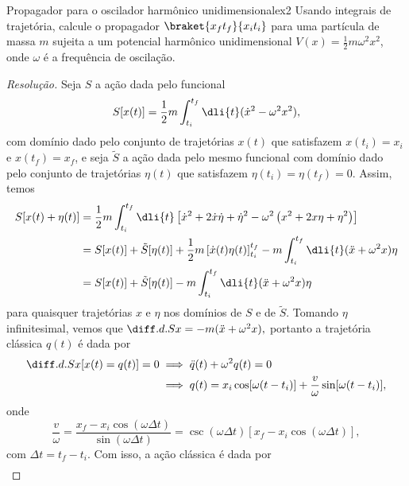\begin{exercício}{Propagador para o oscilador harmônico unidimensional}{ex2}
   Usando integrais de trajetória, calcule o propagador \(\braket{x_f t_f}{x_i t_i}\) para uma partícula de massa \(m\) sujeita a um potencial harmônico unidimensional \(V(x) = \frac12 m \omega^2 x^2\), onde \(\omega\) é a frequência de oscilação.
\end{exercício}
\begin{proof}[Resolução]
   Seja \(S\) a ação dada pelo funcional
   \begin{equation*}
      S[x(t)] = \frac12 m \int_{t_i}^{t_f} \dli{t} (\dot{x}^2 - \omega^2 x^2),
   \end{equation*}
   com domínio dado pelo conjunto de trajetórias \(x(t)\) que satisfazem \(x(t_i) = x_i\) e \(x(t_f) = x_f\), e seja \(\tilde{S}\) a ação dada pelo mesmo funcional com domínio dado pelo conjunto de trajetórias \(\eta(t)\) que satisfazem \(\eta(t_i) = \eta(t_f) = 0.\) Assim, temos
   \begin{align*}
      S[x(t) + \eta(t)]
      &= \frac12 m\int_{t_i}^{t_f} \dli{t} \left[ \dot{x}^2 + 2\dot{x} \dot{\eta} + \dot{\eta}^2 - \omega^2 \left(x^2 + 2x\eta + \eta^2\right)\right]\\
      &= S[x(t)] + \tilde{S}[\eta(t)] + \frac12 m \left[\dot{x}(t) \eta(t)\right]_{t_i}^{t_f} - m \int_{t_i}^{t_f} \dli{t} (\ddot{x} + \omega^2 x) \eta\\
      &= S[x(t)] + \tilde{S}[\eta(t)] - m \int_{t_i}^{t_f} \dli{t} (\ddot{x} + \omega^2 x) \eta
   \end{align*}
   para quaisquer trajetórias \(x\) e \(\eta\) nos domínios de \(S\) e de \(\tilde{S}.\) Tomando \(\eta\) infinitesimal, vemos que \(\diff.d.{S}{x} = -m(\ddot{x} + \omega^2 x),\) portanto a trajetória clássica \(q(t)\) é dada por
   \begin{align*}
      \diff.d.{S}{x}[x(t) = q(t)] = 0 &\implies \ddot{q}(t) + \omega^2 q(t) = 0\\
                                      &\implies q(t) = x_i \cos[\omega (t - t_i)] + \frac{v}{\omega} \sin[\omega (t - t_i)],
   \end{align*}
   onde
   \begin{equation*}
      \frac{v}{\omega} = \frac{x_f - x_i \cos(\omega \Delta t)}{\sin(\omega \Delta t)} = \csc(\omega \Delta t)\left[ x_f - x_i \cos(\omega \Delta t)\right],
   \end{equation*}
   com \(\Delta t = t_f - t_i.\) Com isso, a ação clássica é dada por
   \begin{align*}

\end{align*}
\end{proof}
